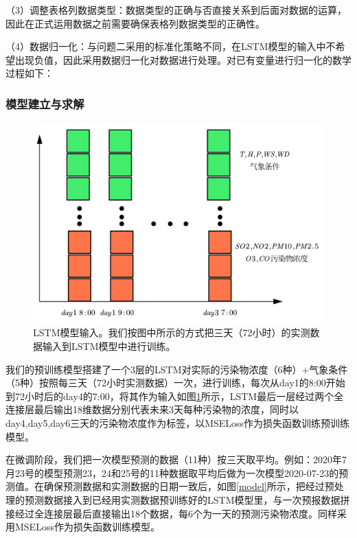 \documentclass[bwprint]{gmcmthesis}
\numberwithin{figure}{section}
\begin{document}
（3）调整表格列数据类型：数据类型的正确与否直接关系到后面对数据的运算，因此在正式运用数据之前需要确保表格列数据类型的正确性。

（4）数据归一化：与问题二采用的标准化策略不同，在LSTM模型的输入中不希望出现负值，因此采用数据归一化对数据进行处理。对已有变量进行归一化的数学过程如下：

\subsubsection{模型建立与求解}
\begin{figure}[!h]
	\centering
	\includegraphics[width=.7\textwidth]{LSTM_input.png}
	\caption{LSTM模型输入。我们按图中所示的方式把三天（72小时）的实测数据输入到LSTM模型中进行训练。}
	\label{LSTM-INPUT}
\end{figure}
我们的预训练模型搭建了一个3层的LSTM对实际的污染物浓度（6种）+气象条件（5种）按照每三天（72小时实测数据）一次，进行训练，每次从day1的8:00开始到72小时后的day4的7:00，将其作为输入如图\ref{LSTM-INPUT}所示，LSTM最后一层经过两个全连接层最后输出18维数据分别代表未来3天每种污染物的浓度，同时以day4,day5,day6三天的污染物浓度作为标签，以MSELoss作为损失函数训练预训练模型。

在微调阶段，我们把一次模型预测的数据（11种）按三天取平均。例如：2020年7月23号的模型预测23，24和25号的11种数据取平均后做为一次模型2020-07-23的预测值。在确保预测数据和实测数据的日期一致后，如图\ref{model}所示，把经过预处理的预测数据接入到已经用实测数据预训练好的LSTM模型里，与一次预报数据拼接经过全连接层最后直接输出18个数据，每6个为一天的预测污染物浓度。同样采用MSELoss作为损失函数训练模型。
\end{document}
